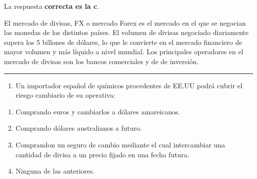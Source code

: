\documentclass[
  letterpaper,
  DIV=11,
  numbers=noendperiod]{scrreprt}
\providecommand{\tightlist}{%
  \setlength{\itemsep}{0pt}\setlength{\parskip}{0pt}}\usepackage{longtable,booktabs,array}
\begin{document}
\begin{tcolorbox}[enhanced jigsaw, left=2mm, opacityback=0, colback=white, breakable, arc=.35mm, bottomrule=.15mm, rightrule=.15mm, toprule=.15mm, leftrule=.75mm, colframe=quarto-callout-tip-color-frame]
\begin{minipage}[t]{5.5mm}
\textcolor{quarto-callout-tip-color}{\faLightbulb}
\end{minipage}%
\begin{minipage}[t]{\textwidth - 5.5mm}

La respuesta \textbf{correcta es la c}.

El mercado de divisas, FX o mercado Forex es el mercado en el que se
negocian las monedas de los distintos países. El volumen de divisas
negociado diariamente supera los 5 billones de dólares, lo que le
convierte en el mercado financiero de mayor volumen y más líquido a
nivel mundial. Los principales operadores en el mercado de divisas son
los bancos comerciales y de de inversión.

\end{minipage}%
\end{tcolorbox}

\begin{center}\rule{0.5\linewidth}{0.5pt}\end{center}

\begin{enumerate}
\def\labelenumi{\arabic{enumi}.}
\setcounter{enumi}{15}
\tightlist
\item
  Un importador español de químicos procedentes de EE.UU podrá cubrir el
  riesgo cambiario de su operativa:
\end{enumerate}

\begin{enumerate}
\def\labelenumi{\alph{enumi})}
\item
  Comprando euros y cambiarlos a dólares amareicanos.
\item
  Comprando dólares australianos a futuro.
\item
  Comprandon un seguro de cambio mediante el cual intercambiar una
  cantidad de divisa a un precio fijado en una fecha futura.
\item
  Ninguna de las anteriores.
\end{enumerate}
\end{document}
